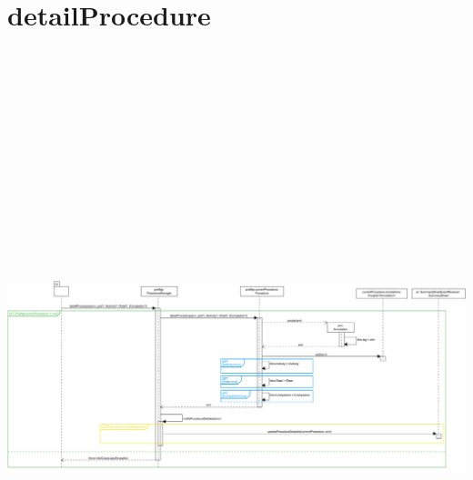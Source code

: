 \section{detailProcedure}
\includegraphics[max width=\textwidth, max height=190mm]{../resources/img/GRP/DSD/op7.png}

\begingroup\centering
\renewcommand{\thesubsection}{\thesection.d.1}
